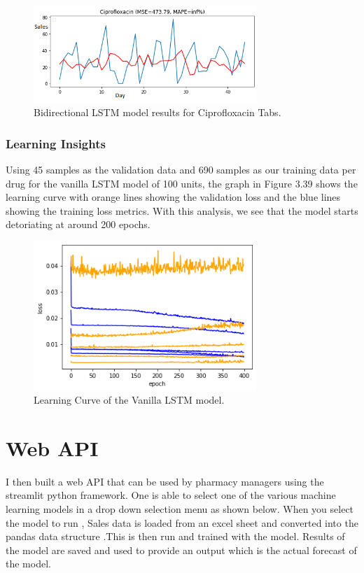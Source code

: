 \documentclass[12pt]{report}
\begin{document}
\begin{figure}[H]%
  \begin {center}
  \includegraphics[width=0.75\textwidth]{images/bi (6)B.png}
  \caption{Bidirectional LSTM model results for Ciprofloxacin Tabs.}
  \label{fig:ecg}
  \end {center}
\end{figure}

\subsubsection{Learning Insights}
Using 45 samples as the validation data and 690 samples as our training data per drug for the vanilla LSTM model of 100 units,  the graph in Figure 3.39 shows the learning curve with orange lines showing the validation loss and the blue lines showing the training loss metrics. 
With this analysis, we see that the model starts detoriating at around 200 epochs. 
\begin{figure}[H]%
  \begin {center}
  \includegraphics[width=0.75\textwidth]{images/learningC.png}
  \caption{Learning Curve of the Vanilla LSTM model.}
  \label{fig:ecg}
  \end {center}
\end{figure}



\section{Web API}
I then built a web API that can be used by pharmacy managers using the streamlit python framework. One is able to select one of the various machine learning models in a drop down selection menu as shown below.
When you select the model to run , Sales data is loaded from an excel sheet and converted into the pandas data structure .This is then run and trained with the model. Results of the model are saved and used to provide an output which is the actual forecast of the model. 
\end{document}
